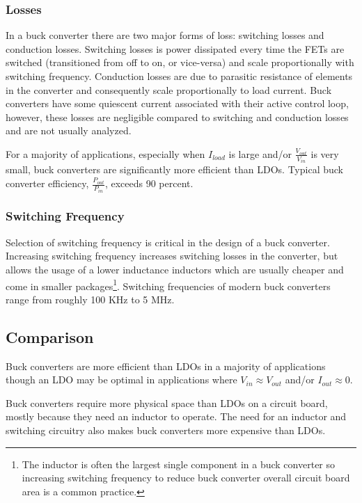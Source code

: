 \documentclass[main.tex]{subfiles}
\begin{document}
\subsubsection{Losses}
In a buck converter there are two major forms of loss: switching losses and conduction losses. Switching losses is power dissipated every time the FETs are switched (transitioned from off to on, or vice-versa) and scale proportionally with switching frequency. Conduction losses are due to parasitic resistance of elements in the converter and consequently scale proportionally to load current. Buck converters have some quiescent current associated with their active control loop, however, these losses are negligible compared to switching and conduction losses and are not usually analyzed. \newline

\newnoindentpara For a majority of applications, especially when $I_{load}$ is large and/or $\frac{V_{out}}{V_{in}}$ is very small, buck converters are significantly more efficient than LDOs. Typical buck converter efficiency, $\frac{P_{out}}{P_{in}}$, exceeds 90 percent.  

\subsubsection{Switching Frequency}
Selection of switching frequency is critical in the design of a buck converter. Increasing switching frequency increases switching losses in the converter, but allows the usage of a lower inductance inductors which are usually cheaper and come in smaller packages\footnote{The inductor is often the largest single component in a buck converter so increasing switching frequency to reduce buck converter overall circuit board area is a common practice.}. Switching frequencies of modern buck converters range from roughly 100 KHz to 5 MHz. 

\subsection{Comparison}
Buck converters are more efficient than LDOs in a majority of applications though an LDO may be optimal in applications where $V_{in} \approx V_{out}$ and/or $I_{out} \approx 0$. \newline

\newnoindentpara Buck converters require more physical space than LDOs on a circuit board, mostly because they need an inductor to operate. The need for an inductor and switching circuitry also makes buck converters more expensive than LDOs. \newline
\end{document}
